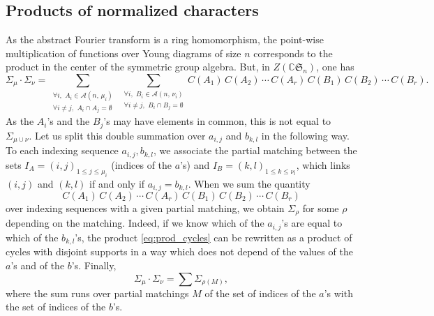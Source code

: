 \documentclass[10pt]{amsart}
\theoremstyle{remark}
\newcommand{\C}{\mathbb{C}}
\newcommand{\Arr}{\mathcal{A}}
\newcommand{\sym}{\mathfrak{S}}
\begin{document}
\subsection{Products of normalized characters}
 As the abstract Fourier transform is a ring homomorphism, 
the point-wise multiplication of functions over Young diagrams of size $n$
 corresponds to the product in the center of the symmetric group algebra.
 But, in $Z(\C\sym_n)$, one has
$$\varSigma_\mu \cdot \varSigma_\nu = \sum_{\substack{\forall i,\,\,A_i \in \Arr(n,\,\mu_i)\\ \forall i\neq j,\,\,A_i\cap A_j=\emptyset}} \ \sum_{ \substack{\forall i,\,\,B_i \in \Arr(n,\,\nu_i)\\ \forall i\neq j,\,\,B_i\cap B_j=\emptyset}} C(A_1)\,C(A_2)\,\cdots \,C(A_r)\, C(B_1)\,C(B_2)\,\cdots \,C(B_r).$$
As the $A_i$'s and the $B_j$'s may have elements in common, this is not equal to $\varSigma_{\mu \cup \nu}$. Let us split this double summation over $a_{i,j}$ and $b_{k,l}$ in the following way. To each indexing sequence $a_{i,j}, b_{k,l}$, we associate the partial matching between the sets $I_A=(i,j)_{1 \leq j \leq \mu_i}$ (indices of the $a$'s) and $I_B=(k,l)_{1 \leq k \leq \nu_l}$, which links $(i,j)$ and $(k,l)$ if and only if $a_{i,j}=b_{k,l}$. When we sum the quantity 
\begin{equation}\label{eq:prod_cycles}
 C(A_1)\,C(A_2)\,\cdots \,C(A_r)\, C(B_1)\,C(B_2)\,\cdots \,C(B_r)
\end{equation}
over indexing sequences with a given partial matching, we obtain $\Sigma_\rho$ for some $\rho$ depending on the matching. Indeed, if we know which of the $a_{i,j}$'s are equal to which of the $b_{k,l}$'s, the product \eqref{eq:prod_cycles} can be rewritten as a product of cycles with disjoint supports in a way which does not depend of the values of the $a$'s and of the $b$'s. Finally,
$$\varSigma_\mu \cdot \varSigma_\nu = \sum \varSigma_{\rho(M)},$$
where the sum runs over partial matchings  $M$ of the set of indices of the $a$'s with the set of indices of the $b$'s.\bigskip
\end{document}
